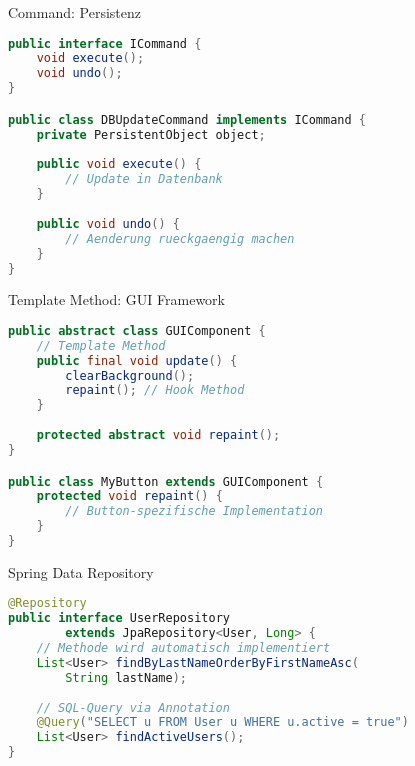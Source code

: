 \begin{example}{Command: Persistenz}
\begin{lstlisting}[language=Java, style=base]
public interface ICommand {
    void execute();
    void undo();
}

public class DBUpdateCommand implements ICommand {
    private PersistentObject object;
    
    public void execute() {
        // Update in Datenbank
    }
    
    public void undo() {
        // Aenderung rueckgaengig machen
    }
}
\end{lstlisting}
\end{example}

\begin{example}{Template Method: GUI Framework}
\begin{lstlisting}[language=Java, style=base]
public abstract class GUIComponent {
    // Template Method
    public final void update() {
        clearBackground();
        repaint(); // Hook Method
    }
    
    protected abstract void repaint();
}

public class MyButton extends GUIComponent {
    protected void repaint() {
        // Button-spezifische Implementation
    }
}
\end{lstlisting}
\end{example}

\begin{example}{Spring Data Repository}
\begin{lstlisting}[language=Java, style=base]
@Repository
public interface UserRepository 
        extends JpaRepository<User, Long> {
    // Methode wird automatisch implementiert
    List<User> findByLastNameOrderByFirstNameAsc(
        String lastName);
    
    // SQL-Query via Annotation
    @Query("SELECT u FROM User u WHERE u.active = true")
    List<User> findActiveUsers();
}
\end{lstlisting}
\end{example}